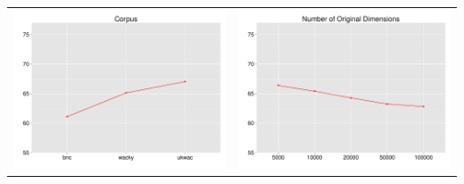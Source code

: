 \documentclass[t]{beamer} %
\begin{document}
\begin{frame}
{\begin{tabular}{c@{}c}
      \includegraphics[scale=0.30]{img/lapesa_toefl_main_corpus} &
      \includegraphics[scale=0.30]{img/lapesa_toefl_main_origdim}
    \end{tabular}
  }
\end{frame}
\end{document}
